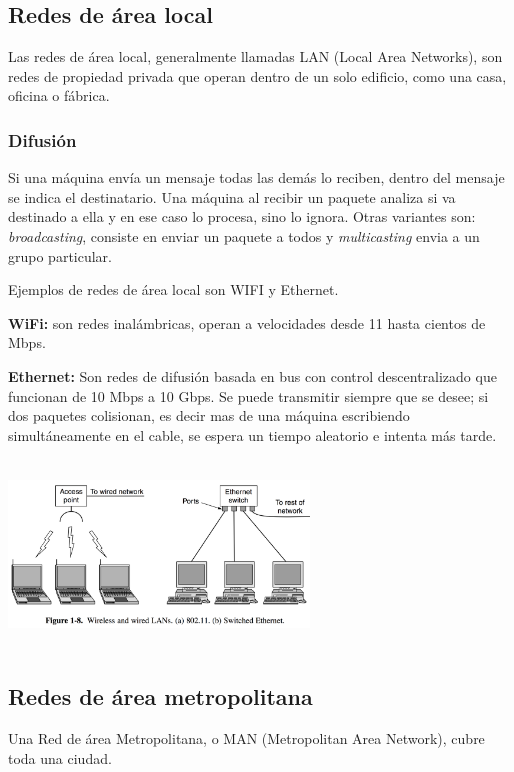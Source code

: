 \documentclass[10pt,a4paper]{report}
\begin{document}
\subsection{Redes de área local}
\par Las redes de área local, generalmente llamadas LAN (Local Area Networks), son 
redes de propiedad privada que operan dentro de un solo edificio, como una casa, 
oficina o fábrica.

\subsubsection{Difusión}
\par Si una máquina envía un mensaje todas las demás lo reciben, dentro del mensaje se indica el destinatario. Una máquina al recibir un paquete analiza si va destinado a ella y en ese caso lo procesa, sino lo ignora. Otras variantes son: \textit{broadcasting}, consiste en enviar un paquete a todos y \textit{multicasting} envia a un grupo particular.
\par Ejemplos de redes de área local son WIFI y Ethernet.

\par \textbf{WiFi:} son redes inalámbricas, operan a velocidades desde 11 hasta cientos de Mbps.

\par \textbf{Ethernet:} Son redes de difusión basada en bus con control descentralizado que funcionan de 10 Mbps a 10 Gbps. Se puede transmitir siempre que se desee; si dos paquetes colisionan, es decir mas de una máquina escribiendo simultáneamente en el cable, se espera un tiempo aleatorio e intenta más tarde.

\begin{center} 
	\includegraphics[width=8cm, height=5cm]{./imagenes/arealocal.png} 
\end{center}

\subsection{Redes de área metropolitana}
\par Una Red de área Metropolitana, o MAN (Metropolitan Area Network), cubre toda 
una ciudad.
\end{document}
